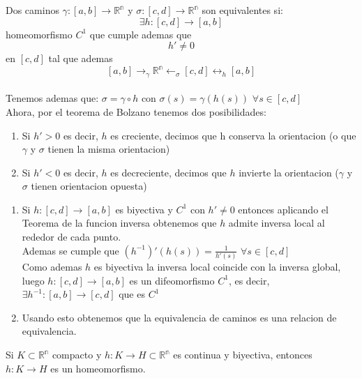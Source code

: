 \begin{definición}
    Dos caminos $\gamma: [a,b] \to \mathbb{R^n}$ y $\sigma:[c,d] \to \mathbb{R^n}$ son equivalentes si: \\
    $$ \exists h:[c,d] \to [a,b] $$ homeomorfismo $C^1$ que cumple ademas que \\
    $$h' \neq 0$$ en $[c,d]$ tal que ademas $$[a,b] \to_{\gamma} \mathbb{R^n} \leftarrow_\sigma [c,d] \leftrightarrow_{h} [a,b]$$ \\
    Tenemos ademas que: $\sigma = \gamma \circ h$ con $\sigma(s) = \gamma(h(s))$ $\forall s \in [c,d]$ \\
    Ahora, por el teorema de Bolzano tenemos dos posibilidades:
    \begin{enumerate}
        \item Si $h'>0$ es decir, $h$ es creciente, decimos que h conserva la orientacion (o que $\gamma$ y $\sigma$ tienen la misma orientacion)
        \item Si $h'<0$ es decir, $h$ es decreciente, decimos que $h$ invierte la orientacion ($\gamma$ y $\sigma$ tienen orientacion opuesta)
    \end{enumerate}
\end{definición}

\begin{observación}
    \begin{enumerate}
        \item Si $h:[c,d] \to [a,b]$ es biyectiva y $C^1$ con $h' \neq 0$ entonces aplicando el Teorema de la funcion inversa obtenemos que $h$ admite inversa local al rededor de cada punto. \\
        Ademas se cumple que $(h^{-1})'(h(s)) = \frac{1}{h'(s)}$ $\forall s \in [c,d]$ \\
        Como ademas $h$ es biyectiva la inversa local coincide con la inversa global, luego $h:[c,d] \to [a,b]$ es un difeomorfismo $C^1$, es decir, $\exists h^{-1}:[a,b] \to [c,d]$ que es $C^1$
        \item Usando esto obtenemos que la equivalencia de caminos es una relacion de equivalencia.
    \end{enumerate}
\end{observación}

\begin{observación}
    Si $K\subset \mathbb{R^n}$ compacto y $h:K \to H\subset \mathbb{R^n}$ es continua y biyectiva, entonces $h:K \to H$ es un homeomorfismo.
\end{observación}

